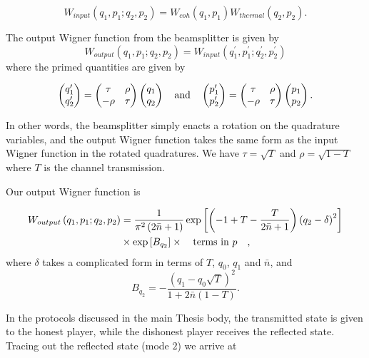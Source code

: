 \begin{equation}
W_{input}\left(q_1, p_1 ; q_2, p_2\right) = W_{coh}\left(q_1, p_1\right) W_{thermal}\left(q_2, p_2\right).
\end{equation}

\noindent The output Wigner function from the beamsplitter is given by
\begin{equation}
W_{output}\left(q_1, p_1 ; q_2, p_2\right) = W_{input}\left(q_1^\prime, p_1^\prime ; q_2^\prime, p_2^\prime \right)
\end{equation}
where the primed quantities are given by

\begin{equation}
\pmqty{q_1^\prime \\ q_2^\prime} = \pmqty{\tau & \rho \\ - \rho & \tau} \pmqty{q_1 \\ q_2} \qq{and} \pmqty{p_1^\prime \\ p_2^\prime} = \pmqty{\tau & \rho \\ - \rho & \tau} \pmqty{p_1 \\ p_2}.
\end{equation}

\noindent In other words, the beamsplitter simply enacts a rotation on the quadrature variables, and the output Wigner function takes the same form as the input Wigner function in the rotated quadratures. We have $\tau = \sqrt{T}$ and $\rho = \sqrt{1-T}$ where $T$ is the channel transmission.

Our output Wigner function is

\begin{align}
W_{output}\left(q_1, p_1; q_2, p_2\right) &= \frac{1}{\pi^2 \left(2 \bar{n}+1\right)} \exp\left[ \left(-1 + T  - \frac{T}{2 \bar{n} 
+1}\right) \left(q_2 - \delta\right)^2 \right]   \notag \\
%
&\times \exp\left[B_{q_2} \right] \times \qq{terms in $p$},
\end{align}
where $\delta$ takes a complicated form in terms of $T$, $q_0$, $q_1$ and $\bar{n}$, and 
\begin{equation}
B_{q_2} = -\frac{\left(q_1 - q_0 \sqrt{T}\right)^2}{1 + 2 \bar{n} \left(1-T\right)}.
\end{equation}

\noindent In the protocols discussed in the main Thesis body, the transmitted state is given to the honest player, while the dishonest player receives the reflected state. Tracing out the reflected state (mode $2$) we arrive at

